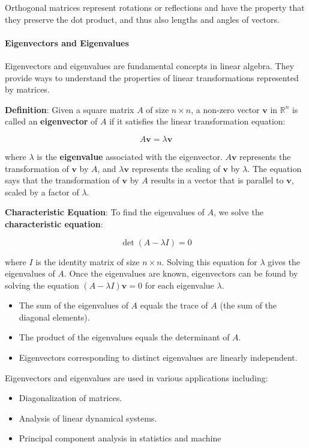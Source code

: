 \documentclass[12pt, twoside,hidelinks]{article}
\theoremstyle{definition}
\numberwithin{equation}{section}
\begin{document}
Orthogonal matrices represent rotations or reflections and have the property that they preserve the dot product, and thus also lengths and angles of vectors.


\paragraph{Eigenvectors and Eigenvalues}

Eigenvectors and eigenvalues are fundamental concepts in linear algebra. They provide ways to understand the properties of linear transformations represented by matrices.

\textbf{Definition}: Given a square matrix $A$ of size $n \times n$, a non-zero vector $\mathbf{v}$ in $\mathbb{R}^n$ is called an \textbf{eigenvector} of $A$ if it satisfies the linear transformation equation:

\[
A\mathbf{v} = \lambda\mathbf{v}
\]

where $\lambda$ is the \textbf{eigenvalue} associated with the eigenvector. $A\mathbf{v}$ represents the transformation of $\mathbf{v}$ by $A$, and $\lambda\mathbf{v}$ represents the scaling of $\mathbf{v}$ by $\lambda$. The equation says that the transformation of $\mathbf{v}$ by $A$ results in a vector that is parallel to $\mathbf{v}$, scaled by a factor of $\lambda$.

\textbf{Characteristic Equation}: To find the eigenvalues of $A$, we solve the \textbf{characteristic equation}:

\[
\det(A - \lambda I) = 0
\]

where $I$ is the identity matrix of size $n \times n$. Solving this equation for $\lambda$ gives the eigenvalues of $A$. Once the eigenvalues are known, eigenvectors can be found by solving the equation $(A - \lambda I)\mathbf{v} = 0$ for each eigenvalue $\lambda$.

\begin{itemize}
    \item The sum of the eigenvalues of $A$ equals the trace of $A$ (the sum of the diagonal elements).
    \item The product of the eigenvalues equals the determinant of $A$.
    \item Eigenvectors corresponding to distinct eigenvalues are linearly independent.
\end{itemize}

Eigenvectors and eigenvalues are used in various applications including:

\begin{itemize}
    \item Diagonalization of matrices.
    \item Analysis of linear dynamical systems.
    \item Principal component analysis in statistics and machine 
\end{itemize}
\end{document}
